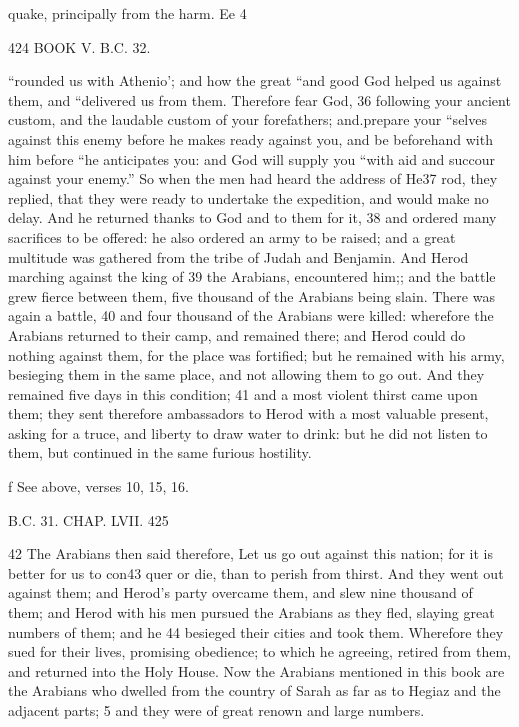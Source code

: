 quake, principally from the harm. Ee 4 

424 BOOK V. B.C. 32. 

“rounded us with Athenio'; and how the great “and good God helped us against them, and 
“delivered us from them. Therefore fear God, 36 following your ancient custom, and the laudable 
 custom of your forefathers; and.prepare your
“selves against this enemy before he makes ready 
 against you, and be beforehand with him before “he anticipates you: and God will supply you 
“with aid and succour against your enemy.” 
So when the men had heard the address of He37 rod, they replied, that they were ready to undertake the expedition, and would make no delay. And he returned thanks to God and to them for it, 38 and ordered many sacrifices to be offered: he also ordered an army to be raised; and a great multitude was gathered from the tribe of Judah and Benjamin. And Herod marching against the king of 39 the Arabians, encountered him;; and the battle grew fierce between them, five thousand of the Arabians being slain. There was again a battle, 40 and four thousand of the Arabians were killed: wherefore the Arabians returned to their camp, and remained there; and Herod could do nothing against them, for the place was fortified; but he remained with his army, besieging them in the same place, and not allowing them to go out. And they remained five days in this condition; 41 and a most violent thirst came upon them; they sent therefore ambassadors to Herod with a most valuable present, asking for a truce, and liberty to draw water to drink: but he did not listen to them, but continued in the same furious hostility. 

f See above, verses 10, 15, 16. 

B.C. 31. CHAP. LVII. 425 

42 The Arabians then said therefore, Let us go out against this nation; for it is better for us to con43 quer or die, than to perish from thirst. And they went out against them; and Herod’s party overcame them, and slew nine thousand of them; and Herod with his men pursued the Arabians as they fled, slaying great numbers of them; and he 44 besieged their cities and took them. Wherefore they sued for their lives, promising obedience; to which he agreeing, retired from them, and returned into the Holy House. 
Now the Arabians mentioned in this book are the Arabians who dwelled from the country of Sarah as far as to Hegiaz and the adjacent parts; 5 and they were of great renown and large numbers. 

